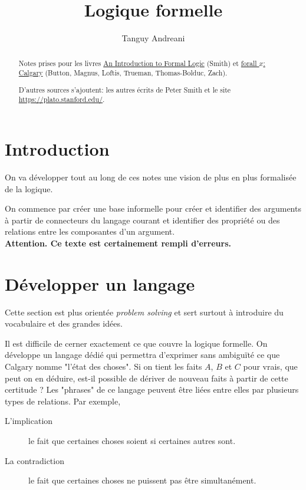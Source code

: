 \documentclass[fleqn,a4paper,nobib]{tufte-handout}
\title{Logique formelle}
\author{Tanguy Andreani}
\begin{document}
\maketitle

\begin{abstract}
Notes prises pour les livres
\underline{An Introduction to Formal Logic} (Smith)
et \underline{forall $x$: Calgary} (Button, Magnus, Loftis, Trueman, Thomas-Bolduc, Zach).

D'autres sources s'ajoutent: les autres écrits de Peter Smith et le site
\url{https://plato.stanford.edu/}.
\end{abstract}

\tableofcontents

\section{Introduction}

On va développer tout au long de ces notes une vision de plus
en plus formalisée de la logique.

On commence par créer une base informelle pour créer et identifier
des arguments à partir de connecteurs du langage courant et identifier
des propriété ou des relations entre les composantes d'un argument.\\

\textbf{Attention. Ce texte est certainement rempli d'erreurs.}


\section{Développer un langage}

Cette section est plus orientée \textit{problem solving}
et sert surtout à introduire du vocabulaire et des grandes idées.

Il est difficile de cerner exactement ce que couvre la logique
formelle. On développe un langage dédié qui permettra d'exprimer
sans ambiguïté ce que Calgary nomme "l'état des choses". Si on tient
les faits $A$, $B$ et $C$ pour vrais, que peut on en déduire, est-il
possible de dériver de nouveau faits à partir de cette certitude ? Les
"phrases" de ce langage peuvent être liées entre elles par
plusieurs types de relations. Par exemple,

\begin{description}
    \item[L'implication] le fait que certaines choses soient si certaines autres sont.
    \item[La contradiction] le fait que certaines choses ne puissent pas être simultanément.
\end{description}
\end{document}
